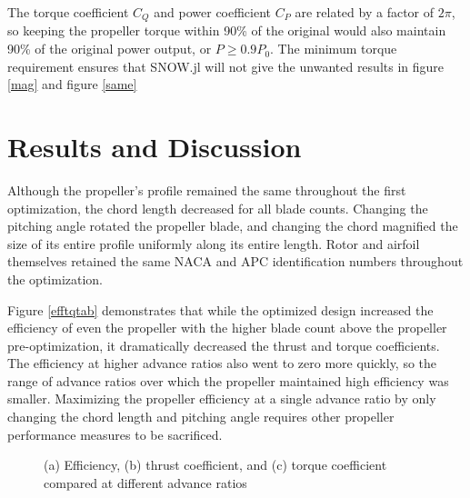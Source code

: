 \documentclass[journal ]{new-aiaa}
\begin{document}
The torque coefficient $C_{Q}$ and power coefficient $C_{P}$ are related by a factor of $2 \pi$, so keeping the propeller torque within 90\% of the original would also maintain 90\% of the original power output, or $P \geq 0.9 P_{0}$. The minimum torque requirement ensures that SNOW.jl will not give the unwanted results in figure \eqref{mag} and figure \eqref{same}


\section{Results and Discussion}

Although the propeller's profile remained the same throughout the first optimization, the chord length decreased for all blade counts. Changing the pitching angle rotated the propeller blade, and changing the chord magnified the size of its entire profile uniformly along its entire length. Rotor and airfoil themselves retained the same NACA and APC identification numbers throughout the optimization.

Figure \eqref{efftqtab} demonstrates that while the optimized design increased the efficiency of even the propeller with the higher blade count above the propeller pre-optimization, it dramatically decreased the thrust and torque coefficients. The efficiency at higher advance ratios also went to zero more quickly, so the range of advance ratios over which the propeller maintained high efficiency was smaller. Maximizing the propeller efficiency at a single advance ratio by only changing the chord length and pitching angle requires other propeller performance measures to be sacrificed.

\begin{figure}[H]
\centering

	\hspace{1em}
	\caption{(a) Efficiency, (b) thrust coefficient, and (c) torque coefficient compared at different advance ratios}
	\captionsetup{aboveskip=0pt,font=it}
	\label{efftqtab}
\end{figure}
\end{document}
